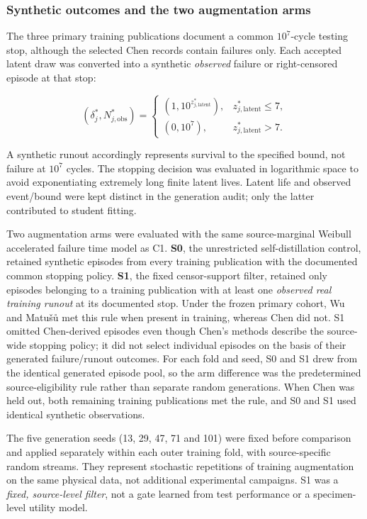 \documentclass[12pt,a4paper]{article}
\begin{document}
\subsubsection{Synthetic outcomes and the two augmentation arms}

The three primary training publications document a common \(10^7\)-cycle testing stop, although the selected Chen records contain failures only. Each accepted latent draw was converted into a synthetic \emph{observed} failure or right-censored episode at that stop:

\begin{equation}
(\delta_j^{*},N_{j,\mathrm{obs}}^{*})
=
\begin{cases}
(1,10^{z_{j,\mathrm{latent}}^{*}}),
& z_{j,\mathrm{latent}}^{*}\leq 7,\\[2pt]
(0,10^7),
& z_{j,\mathrm{latent}}^{*}>7.
\end{cases}
\tag{2.5c}
\end{equation}

A synthetic runout accordingly represents survival to the specified bound, not failure at \(10^7\) cycles. The stopping decision was evaluated in logarithmic space to avoid exponentiating extremely long finite latent lives. Latent life and observed event/bound were kept distinct in the generation audit; only the latter contributed to student fitting.

Two augmentation arms were evaluated with the same source-marginal Weibull accelerated failure time model as C1. \textbf{S0}, the unrestricted self-distillation control, retained synthetic episodes from every training publication with the documented common stopping policy. \textbf{S1}, the fixed censor-support filter, retained only episodes belonging to a training publication with at least one \emph{observed real training runout} at its documented stop. Under the frozen primary cohort, Wu and Matušů met this rule when present in training, whereas Chen did not. S1 omitted Chen-derived episodes even though Chen's methods describe the source-wide stopping policy; it did not select individual episodes on the basis of their generated failure/runout outcomes. For each fold and seed, S0 and S1 drew from the identical generated episode pool, so the arm difference was the predetermined source-eligibility rule rather than separate random generations. When Chen was held out, both remaining training publications met the rule, and S0 and S1 used identical synthetic observations.

The five generation seeds (13, 29, 47, 71 and 101) were fixed before comparison and applied separately within each outer training fold, with source-specific random streams. They represent stochastic repetitions of training augmentation on the same physical data, not additional experimental campaigns. S1 was a \emph{fixed, source-level filter}, not a gate learned from test performance or a specimen-level utility model.
\end{document}
